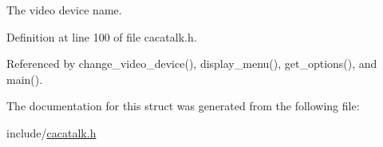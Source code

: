 \-The video device name. 



\-Definition at line 100 of file cacatalk.\-h.



\-Referenced by change\-\_\-video\-\_\-device(), display\-\_\-menu(), get\-\_\-options(), and main().



\-The documentation for this struct was generated from the following file\-:\begin{DoxyCompactItemize}
\item 
include/\hyperlink{cacatalk_8h}{cacatalk.\-h}\end{DoxyCompactItemize}
